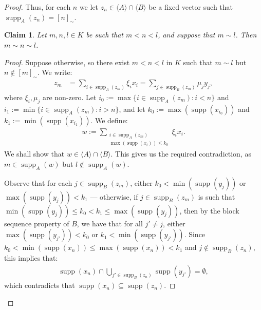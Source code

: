 \documentclass[11pt,reqno]{amsart}
\theoremstyle{plain}
\numberwithin{equation}{section}
\newtheorem{claim}{Claim}
\theoremstyle{definition}
\newcommand{\func}{\operatorname}
\renewcommand{\c}[1]{\langle #1 \rangle}
\newcommand{\supp}{\func{supp}}
\newenvironment{midproof}[1][Proof]
  {\begin{proof}[#1]\renewcommand{\qedsymbol}{$\blacksquare$}}
  {\end{proof}}
\begin{document}
\begin{proof}
    Thus, for each $n$ we let $z_n \in \c{A} \cap \c{B}$ be a fixed vector such that $\supp_A(z_n) = [n]_\sim$. 

    \begin{claim}
    \label{claim:eq.classes.are.blocks}
        Let $m,n,l \in K$ be such that $m < n < l$, and suppose that $m \sim l$. Then $m \sim n \sim l$.
    \end{claim}

    \begin{midproof}
        Suppose otherwise, so there exist $m < n < l$ in $K$ such that $m \sim l$ but $n \notin [m]_\sim$. We write:
        \begin{align*}
            z_m &= \sum_{i \in \supp_A(z_m)} \xi_ix_i = \sum_{j \in \supp_B(z_m)} \mu_jy_j,
        \end{align*} 
        where $\xi_i,\mu_j$ are non-zero. Let $i_0 := \max\{i \in \supp_A(z_m) : i < n\}$ and $i_1 := \min\{i \in \supp_A(z_m) : i > n\}$, and let $k_0 := \max(\supp(x_{i_0}))$ and $k_1 := \min(\supp(x_{i_1}))$. We define:
        \begin{align*}
            w := \sum_{\substack{i \in \supp_A(z_m) \\ \max(\supp(x_i)) \leq k_0}} \xi_ix_i.
        \end{align*}
        We shall show that $w \in \c{A} \cap \c{B}$. This gives us the required contradiction, as $m \in \supp_A(w)$ but $l \not\in \supp_A(w)$. 

        Observe that for each $j \in \supp_B(z_m)$, either $k_0 < \min(\supp(y_j))$ or $\max(\supp(y_j)) < k_1$ --- otherwise, if $j \in \supp_B(z_m)$ is such that $\min(\supp(y_j)) \leq k_0 < k_1 \leq \max(\supp(y_j))$, then by the block sequence property of $B$, we have that for all $j' \neq j$, either $\max(\supp(y_{j'})) < k_0$ or $k_1 < \min(\supp(y_{j'}))$. Since $k_0 < \min(\supp(x_n)) \leq \max(\supp(x_n)) < k_1$ and $j \notin \supp_B(z_n)$, this implies that:
        \begin{align*}
            \supp(x_n) \cap \bigcup_{j' \in \supp_B(z_n)} \supp(y_{j'}) = \emptyset,
        \end{align*}
        which contradicts that $\supp(x_n) \subseteq \supp(z_n)$. 


\end{midproof}
\end{proof}
\end{document}
